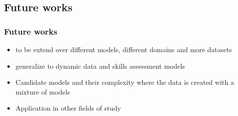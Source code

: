 \documentclass{beamer}
\begin{document}


\subsection{Future works}
\begin{frame}\frametitle{Future works}
\begin{itemize}
\item to be extend over different models, different domains and more datasets \pause
\item generalize to dynamic data and skills assessment models \pause
\item Candidate models and their complexity where the data is created with a mixture of models \pause
\item Application in other fields of study  
\end{itemize}
\end{frame}
\end{document}
